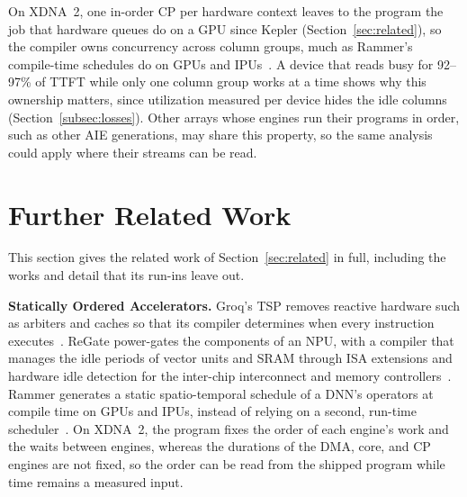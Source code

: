 On XDNA~2, one in-order CP per hardware context leaves to the program the job that hardware queues do on a GPU since Kepler (Section~\ref{sec:related}), so the compiler owns concurrency across column groups, much as Rammer's compile-time schedules do on GPUs and IPUs~\citep{ma2020rammer}.
A device that reads busy for 92--97\% of TTFT while only one column group works at a time shows why this ownership matters, since utilization measured per device hides the idle columns (Section~\ref{subsec:losses}).
Other arrays whose engines run their programs in order, such as other AIE generations, may share this property, so the same analysis could apply where their streams can be read.

\section{Further Related Work}
\label{app:related}

This section gives the related work of Section~\ref{sec:related} in full, including the works and detail that its run-ins leave out.

\textbf{Statically Ordered Accelerators.}
Groq's TSP removes reactive hardware such as arbiters and caches so that its compiler determines when every instruction executes~\citep{abts2020tsp}.
ReGate power-gates the components of an NPU, with a compiler that manages the idle periods of vector units and SRAM through ISA extensions and hardware idle detection for the inter-chip interconnect and memory controllers~\citep{xue2025regate}.
Rammer generates a static spatio-temporal schedule of a DNN's operators at compile time on GPUs and IPUs, instead of relying on a second, run-time scheduler~\citep{ma2020rammer}.
On XDNA~2, the program fixes the order of each engine's work and the waits between engines, whereas the durations of the DMA, core, and CP engines are not fixed, so the order can be read from the shipped program while time remains a measured input.

